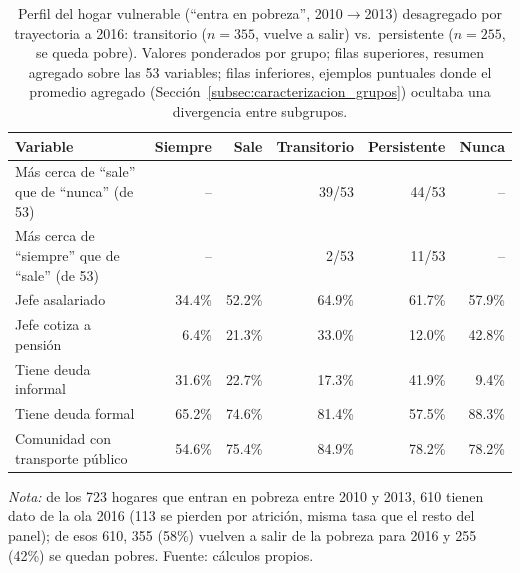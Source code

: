 \begin{table}[H]
  \centering
  \caption{Perfil del hogar vulnerable (``entra en pobreza'', 2010$\to$2013) desagregado por trayectoria a 2016: transitorio ($n=355$, vuelve a salir) vs.\ persistente ($n=255$, se queda pobre). Valores ponderados por grupo; filas superiores, resumen agregado sobre las 53 variables; filas inferiores, ejemplos puntuales donde el promedio agregado (Sección~\ref{subsec:caracterizacion_grupos}) ocultaba una divergencia entre subgrupos.}
  \label{tab:perfil_split_trayectoria}
  \footnotesize
  \setlength{\tabcolsep}{4pt}
  \begin{tabular}{lrrrrr}
    \toprule
    \textbf{Variable} & \textbf{Siempre} & \textbf{Sale} & \textbf{Transitorio} & \textbf{Persistente} & \textbf{Nunca} \\
    \midrule
    Más cerca de ``sale'' que de ``nunca'' (de 53) & \multicolumn{2}{c}{--} & 39/53 & 44/53 & -- \\
    Más cerca de ``siempre'' que de ``sale'' (de 53) & \multicolumn{2}{c}{--} & 2/53 & 11/53 & -- \\
    \addlinespace
    Jefe asalariado & 34.4\% & 52.2\% & 64.9\% & 61.7\% & 57.9\% \\
    Jefe cotiza a pensión & 6.4\% & 21.3\% & 33.0\% & 12.0\% & 42.8\% \\
    Tiene deuda informal & 31.6\% & 22.7\% & 17.3\% & 41.9\% & 9.4\% \\
    Tiene deuda formal & 65.2\% & 74.6\% & 81.4\% & 57.5\% & 88.3\% \\
    Comunidad con transporte público & 54.6\% & 75.4\% & 84.9\% & 78.2\% & 78.2\% \\
    \bottomrule
  \end{tabular}
  \begin{minipage}{0.95\textwidth}
    \vspace{4pt}
    \footnotesize \textit{Nota:} de los 723 hogares que entran en pobreza entre 2010 y 2013, 610 tienen dato de la ola 2016 (113 se pierden por atrición, misma tasa que el resto del panel); de esos 610, 355 (58\%) vuelven a salir de la pobreza para 2016 y 255 (42\%) se quedan pobres. Fuente: cálculos propios.
  \end{minipage}
\end{table}